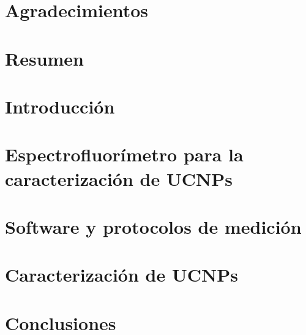 \documentclass[12pt]{report}
\begin{document}

\chapter*{Agradecimientos}

\chapter*{Resumen}

\tableofcontents


\chapter{Introducción}


\chapter{Espectrofluorímetro para la caracterización de UCNPs}


\chapter{Software y protocolos de medición}


\chapter{Caracterización de UCNPs}


\chapter{Conclusiones}






\begin{appendices}

\end{appendices}
\end{document}
